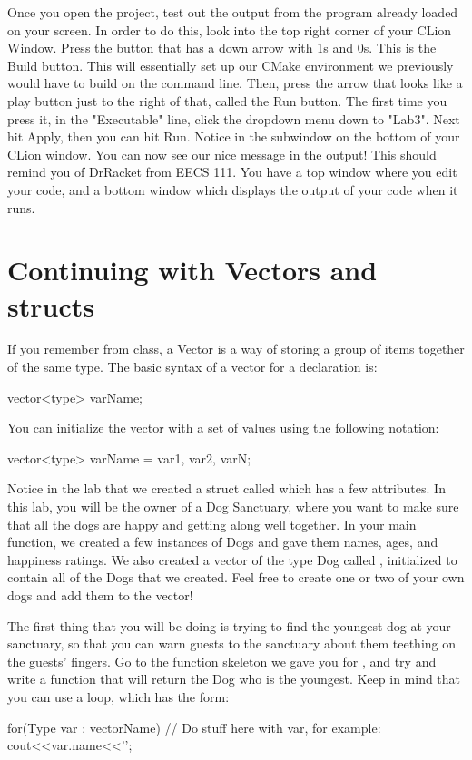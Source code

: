 \documentclass{tufte-handout}
\begin{document}
Once you open the project, test out the output from the program already loaded on your screen.  In order to do this, look into the top right corner of your CLion Window.  Press the button that has a down arrow with 1s and 0s.  This is the Build button.  This will essentially set up our CMake environment we previously would have to build on the command line.   Then, press the arrow that looks like a play button just to the right of that, called the Run button.  The first time you press it, in the "Executable" line, click the dropdown menu down to "Lab3".  Next hit Apply, then you can hit Run.  Notice in the subwindow on the bottom of your CLion window. You can now see our nice message in the output! This should remind you of DrRacket from EECS 111. You have a top window where you edit your code, and a bottom window which displays the output of your code when it runs.

\section{Continuing with Vectors and structs}
If you remember from class, a Vector is a way of storing a group of items together of the same type.  The basic syntax of a vector for a declaration is:
\begin{Code}
vector<type> varName;
\end{Code}

You can initialize the vector with a set of values using the following notation:
\begin{Code}
vector<type> varName = {var1, var2, varN};
\end{Code}

Notice in the lab that we created a struct called  which has a few attributes.  In this lab, you will be the owner of a Dog Sanctuary, where you want to make sure that all the dogs are happy and getting along well together.  In your main function, we created a few instances of Dogs and gave them names, ages, and happiness ratings.    We also created a vector of the type Dog called , initialized to contain all of the Dogs that we created.  Feel free to create one or two of your own dogs and add them to the vector!


The first thing that you will be doing is trying to find the youngest dog at your sanctuary, so that you can warn guests to the sanctuary about them teething on the guests' fingers.   Go to the function skeleton we gave you for , and try and write a function that will return the Dog who is the youngest. Keep in mind that you can use a  loop, which has the form:
\begin{Code}
    for(Type var : vectorName){
        // Do stuff here with var, for example:
        cout<<var.name<<'\n';
    }
\end{Code}
\end{document}
